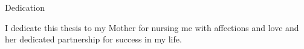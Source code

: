 
Dedication

\noindent I dedicate this thesis to my Mother for nursing me with affections and love and her dedicated partnership for success in my life. 